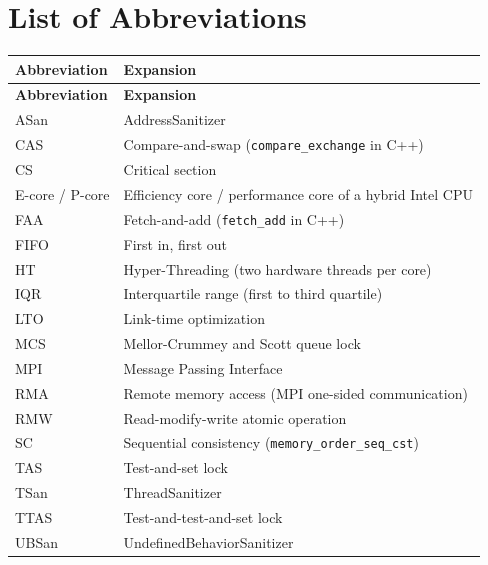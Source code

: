 \section*{List of Abbreviations}

{\small
\begin{longtable}{|>{\raggedright\arraybackslash}p{}|>{\raggedright\arraybackslash}p{}|}
\hline
\textbf{Abbreviation} & \textbf{Expansion} \\ \hline
\endfirsthead
\hline
\textbf{Abbreviation} & \textbf{Expansion} \\ \hline
\endhead
ASan & AddressSanitizer \\ \hline
CAS & Compare-and-swap (\texttt{compare\_exchange} in C++) \\ \hline
CS & Critical section \\ \hline
E-core / P-core & Efficiency core / performance core of a hybrid Intel CPU \\ \hline
FAA & Fetch-and-add (\texttt{fetch\_add} in C++) \\ \hline
FIFO & First in, first out \\ \hline
HT & Hyper-Threading (two hardware threads per core) \\ \hline
IQR & Interquartile range (first to third quartile) \\ \hline
LTO & Link-time optimization \\ \hline
MCS & Mellor-Crummey and Scott queue lock \\ \hline
MPI & Message Passing Interface \\ \hline
RMA & Remote memory access (MPI one-sided communication) \\ \hline
RMW & Read-modify-write atomic operation \\ \hline
SC & Sequential consistency (\texttt{memory\_order\_seq\_cst}) \\ \hline
TAS & Test-and-set lock \\ \hline
TSan & ThreadSanitizer \\ \hline
TTAS & Test-and-test-and-set lock \\ \hline
UBSan & UndefinedBehaviorSanitizer \\ \hline
\end{longtable}
}
